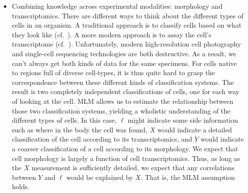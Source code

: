 \begin{itemize}
    \item Combining knowledge across experimental modalities: morphology and transcriptomics.  There are different ways to think about the different types of cells in an organism.  A traditional approach is to classify cells based on what they look like (cf.\ \cite{steinman1973identification,bloomfield1982physiological}).  A more modern approach is to assay the cell's transcriptome (cf.\ \citep{tasic2017shared}).  Unfortunately, modern high-resolution cell photography and single-cell sequencing technologies are both destructive.  As a result, we can't always get both kinds of data for the same specimens.  For cells native to regions full of diverse cell-types, it is thus quite hard to grasp the correspondence between these different kinds of classification systems.  The result is two completely independent classifications of cells, one for each way of looking at the cell.  MLM allows us to estimate the relationship between those two classification systems, yielding a wholistic understanding of the different types of cells.  In this case, $\ell$ might indicate some side information such as where in the body the cell was found, $X$ would indicate a detailed classification of the cell according to its transcriptomics, and $Y$ would indicate a coarser classification of a cell according to its morphology.  We expect that cell morphology is largely a function of cell transcriptomics.  Thus, as long as the $X$ measurement is sufficiently detailed, we expect that any correlations between $Y$ and $\ell$ would be explained by $X$.  That is, the MLM assumption holds.  
 

\end{itemize}
